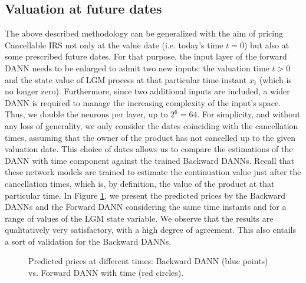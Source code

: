 	\subsection{Valuation at future dates}\label{sec:time}

		The above described methodology can be generalized with the aim of pricing Cancellable IRS not only at the value date (i.e. today's time $t = 0$) but also at some prescribed future dates. For that purpose, the input layer of the forward DANN needs to be enlarged to admit two new inputs: the valuation time $t > 0$ and the state value of LGM process at that particular time instant $x_t$ (which is no longer zero). Furthermore, since two additional inputs are included, a wider DANN is required to manage the increasing complexity of the input's space. Thus, we double the neurons per layer, up to $2^6 = 64$. For simplicity, and without any loss of generality, we only consider the dates coinciding with the cancellation times, assuming that the owner of the product has not cancelled up to the given valuation date. This choice of dates allows us to compare the estimations of the DANN with time component against the trained Backward DANNs. Recall that these network models are trained to estimate the continuation value just after the cancellation times, which is, by definition, the value of the product at that particular time. In Figure \ref{fig:CV_Vpred}, we present the predicted prices by the Backward DANNs and the Forward DANN considering the same time instants and for a range of values of the LGM state variable. We observe that the results are qualitatively very satisfactory, with a high degree of agreement. This also entails a sort of validation for the Backward DANNs.
		\begin{figure}[h!]
			\centering
			\caption{Predicted prices at different times: Backward DANN (blue points) vs. Forward DANN with time (red circles).}
			\label{fig:CV_Vpred}
		\end{figure}

